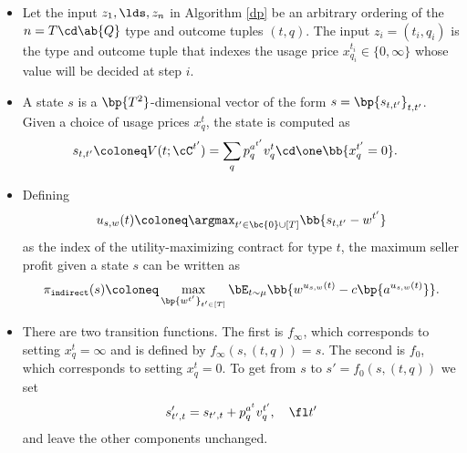 \begin{itemize}
    \item Let the input $z_1,\lds,z_n$ in Algorithm \ref{dp} be an arbitrary ordering of the $n = T\cd \ab{Q}$ type and outcome tuples $(t,q)$. The input $z_i = (t_i, q_i)$ is the type and outcome tuple that indexes the usage price $x^{t_i}_{q_i} \in \{ 0, \infty \}$ whose value will be decided at step $i$.

    \item A state $s$ is a $\bp{T^2}$-dimensional vector of the form $s = \bp{s_{t,t'}}_{t,t'}$. Given a choice of usage prices $x^t_q$, the state is computed as
    \begin{align*} \label{valid-s}
        s_{t,t'} &\coloneq V(t;\cC^{t'}) = \sum_{q} p^{a^{t'}}_q v^t_q \cd \one\bb{x^{t'}_q = 0}.
    \end{align*}

    \item Defining $$u_{s,w}(t) \coloneq \argmax_{t'\in \bc{0} \cup [T]} \bb{s_{t, t'} - w^{t'}}$$ as the index of the utility-maximizing contract for type $t$, the maximum seller profit given a state $s$ can be written as
    $$\pi_{\tt{indirect}}(s) \coloneq \max_{\bp{w^{t'}}_{t'\in [T]}} \bE_{t\sim \mu} \bb{w^{u_{s,w}(t)} - c\bp{a^{u_{s,w}(t)}}}.$$

    \item There are two transition functions. The first is $f_\infty$, which corresponds to setting $x^t_q = \infty$ and is defined by $f_\infty(s, (t,q)) = s$. The second is $f_0$, which corresponds to setting $x^t_q = 0$. To get from $s$ to $s' = f_0(s,(t,q))$ we set $$s'_{t',t} = s_{t',t} + p^{a^t}_q v^{t'}_q, \quad \fl t'$$ and leave the other components unchanged.


\end{itemize}
    

